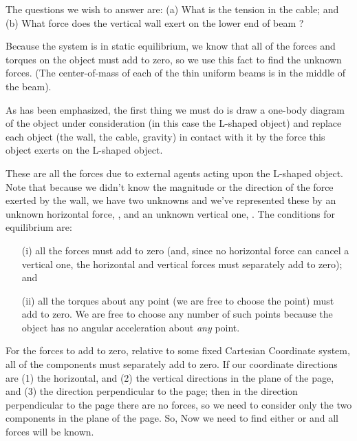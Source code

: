 {{The questions we wish to answer are: (a) What is the tension in the cable; and
(b) What force does the vertical wall exert on the lower end of beam ?

Because the system is in static equilibrium, we know that all of the
forces and torques on the object must add to zero, so we use this
fact to find the unknown forces.
(The center-of-mass of each of the thin uniform beams is in the
middle of the beam).

As has been emphasized, the first thing we must do is draw a
one-body diagram of the object under consideration (in this case
the L-shaped object) and replace each object (the wall, the cable,
gravity) in contact with it by the force this object exerts on the
L-shaped object.

These are all the forces due to external agents acting upon the
L-shaped object.
Note that because we didn't know the magnitude or the direction of
the force exerted by the wall, we have two unknowns and we've
represented these by an unknown horizontal force, , and
an unknown vertical one, .
The conditions for equilibrium are:
\begin{itemize}
\item [(i)] all the forces must add to zero (and, since no horizontal
            force can cancel a vertical one, the horizontal and vertical
            forces must separately add to zero); and
\item [(ii)] all the torques about any point (we are free to choose
        the point) must add to zero.
            We are free to choose any number of such points because the
            object has no angular acceleration about \textit{any} point.
\end{itemize}

For the forces to add to zero, relative to some fixed Cartesian Coordinate
system, all of the components must separately add to zero.
If our coordinate directions are (1) the horizontal, and (2) the vertical
directions in the plane of the page, and (3) the direction perpendicular to
the page; then in the direction perpendicular to the page there are no
forces, so we need to consider only the two components in the plane of the
page.
So, 
%
%
Now we need to find either  or  and all forces will be known.


}}
